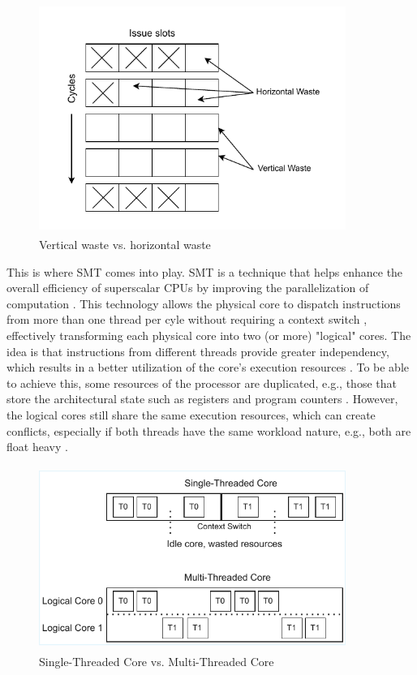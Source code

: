 \begin{figure}[H]
    \centering
    \includegraphics[width=10cm, height=7.5cm]{figures/cpu_wastages}
    \hspace{-2.5cm}
    \caption{Vertical waste vs. horizontal waste}
    \label{fig:cpu}
\end{figure}
\noindent
This is where \acl{SMT} comes into play. \acs{SMT} is a technique that helps enhance the overall efficiency of superscalar CPUs 
by improving the parallelization of computation \cite{SMT_under_the_hood}. This technology allows the 
physical core to dispatch instructions from more than one thread per cyle without requiring 
a context switch \cite{SMT_Maximizing_on_chip_parallelism}, effectively transforming each physical core into two (or more) "logical" cores. The idea is that instructions from different
threads provide greater independency, which results in a better utilization of the core's execution 
resources \cite{SMT_under_the_hood}.
To be able to achieve this, some resources of the processor are duplicated, 
e.g., those that store the architectural state such as registers and program 
counters \cite{SMT_under_the_hood}. However, the logical 
cores still share the same execution resources, which can create conflicts, especially if both threads have 
the same workload nature, e.g., both are float heavy \cite{SMT_modeling_resource_contention}. 
\begin{figure}[H]
    \centering
    \hspace*{-2cm} 
    \includegraphics[width=10cm, height=6cm]{figures/single_vs_multithreaded}
    \caption{Single-Threaded Core vs. Multi-Threaded Core}
    \label{fig:all}
\end{figure}
